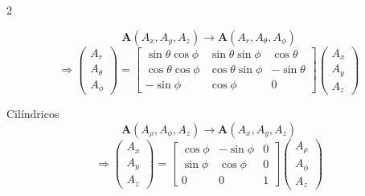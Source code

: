 \begin{multicols}{2}
\begin{itemform}
                              $$\mathbf{A}(A_x, A_y, A_z) \to \mathbf{A}(A_r, A_\theta, A_\phi)$$
                              $$\Rightarrow
                              \begin{pmatrix}
                                A_r \\
                                A_\theta \\
                                A_\phi
                              \end{pmatrix}
                              =
                              \begin{bmatrix}
                                \sin\theta\cos\phi & \sin\theta\sin\phi & \cos\theta \\
                                \cos\theta\cos\phi & \cos\theta\sin\phi & -\sin\theta \\
                                -\sin\phi & \cos\phi & 0
                              \end{bmatrix}
                              \begin{pmatrix}
                                A_x \\
                                A_y \\
                                A_z
                              \end{pmatrix}
                              $$

                            \item Cilíndricos
                              $$\mathbf{A}(A_\rho, A_\phi, A_z) \to \mathbf{A}(A_x, A_y, A_z)$$
                              $$\Rightarrow
                              \begin{pmatrix}
                                A_x \\
                                A_y \\
                                A_z
                              \end{pmatrix}
                              =
                              \begin{bmatrix}
                                \cos\phi & -\sin\phi & 0 \\
                                \sin\phi & \cos\phi & 0 \\
                                0 & 0 & 1
                              \end{bmatrix}
                              \begin{pmatrix}
                                A_\rho \\
                                A_\phi \\
                                A_z
                              \end{pmatrix}
                              $$


\end{itemform}
\end{multicols}
